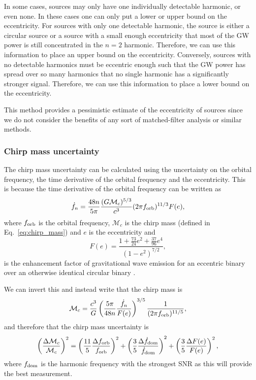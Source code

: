 In some cases, sources may only have one individually detectable harmonic, or even none. In these cases one can only put a lower or upper bound on the eccentricity. For sources with only one detectable harmonic, the source is either a circular source or a source with a small enough eccentricity that most of the GW power is still concentrated in the $n = 2$ harmonic. Therefore, we can use this information to place an upper bound on the eccentricity. Conversely, sources with no detectable harmonics must be eccentric enough such that the GW power has spread over so many harmonics that no single harmonic has a significantly stronger signal. Therefore, we can use this information to place a lower bound on the eccentricity.

This method provides a pessimistic estimate of the eccentricity of sources since we do not consider the benefits of any sort of matched-filter analysis or similar methods.

\subsubsection{Chirp mass uncertainty}

The chirp mass uncertainty can be calculated using the uncertainty on the orbital frequency, the time derivative of the orbital frequency and the eccentricity. This is because the time derivative of the orbital frequency can be written as
\begin{equation}\label{eq:f_n_dot}
    \dot{f}_{n} = \frac{48 n}{5 \pi} \frac{(G \mathcal{M}_c)^{5/3}}{c^3} (2 \pi f_{\rm orb})^{11/3} F(e),
\end{equation}
where $f_{\rm orb}$ is the orbital frequency, $\mathcal{M}_{c}$ is the chirp mass (defined in Eq.~\ref{eq:chirp_mass}) and $e$ is the eccentricity and
\begin{equation}
    F(e) = \frac{1 + \frac{73}{24} e^2 + \frac{37}{96} e^4}{(1 - e^2)^{7/2}},
\end{equation}
is the enhancement factor of gravitational wave emission for an eccentric binary over an otherwise identical circular binary \citep[][Eq.~17]{Peters+1963}.

We can invert this and instead write that the chirp mass is
\begin{equation}
    \mathcal{M}_c = \frac{c^3}{G} \left( \frac{5 \pi}{48 n} \frac{\dot{f}_{n}}{F(e)} \right)^{3/5} \frac{1}{(2 \pi f_{\rm orb})^{11/5}},
\end{equation}
and therefore that the chirp mass uncertainty is
\begin{equation}\label{eq:chirp_mass_uncertainty}
    \qty( \frac{\Delta \mathcal{M}_c}{\mathcal{M}_c} )^2 = \left( \frac{11}{5} \frac{\Delta f_{\rm orb}}{f_{\rm orb}} \right)^2 + \left( \frac{3}{5} \frac{\Delta \dot{f}_{\rm dom}}{\dot{f}_{\rm dom}} \right)^2 + \left( \frac{3}{5} \frac{\Delta F(e)}{F(e)} \right)^2,
\end{equation}
where $f_{\rm dom}$ is the harmonic frequency with the strongest SNR as this will provide the best measurement.

